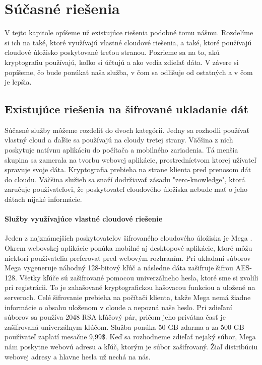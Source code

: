 \chapter{Súčasné riešenia}

V tejto kapitole opíšeme už existujúce riešenia podobné tomu nášmu. Rozdelíme si ich na také, ktoré využívajú vlastné cloudové riešenia, a také, ktoré používajú cloudové úložisko poskytované treťou stranou. Pozrieme sa na to, akú kryptografiu používajú, koľko si účtujú a ako vedia zdieľať dáta. V závere si popíšeme, čo bude ponúkať naša služba, v čom sa odlišuje od ostatných a v čom je lepšia.
	
\section{Existujúce riešenia na šifrované ukladanie dát}
	Súčasné služby môžeme rozdeliť do dvoch kategórií. Jedny sa rozhodli používať vlastný cloud a ďaľšie sa používajú na cloudy tretej strany. Väčšina z nich poskytuje natívnu aplikáciu do počítača a mobilného zariadenia. Tá menšia skupina sa zamerala na tvorbu webovej aplikácie, prostredníctvom ktorej užívateľ spravuje svoje dáta. Kryptografia prebieha na strane klienta pred prenosom dát do cloudu. Väčšina služieb sa snaží dodržiavať zásadu "zero-knowledge", ktorá zaručuje používateľovi, že poskytovateľ cloudového úložiska nebude mať o jeho dátach nijaké informácie. 
	
	\subsubsection{Služby využívajúce vlastné cloudové riešenie}
		Jeden z najznámejších poskytovateľov šifrovaného cloudového úložiska je Mega \cite{mega}. Okrem webovskej aplikácie ponúka mobilné aj desktopové aplikácie, ktoré môžu niektorí používatelia preferovať pred webovým rozhraním. Pri ukladaní súborov Mega vygeneruje náhodný 128-bitový kľúč a následne dáta zašifruje šifrou AES-128. Všetky kľúče sú zašifrované pomocou univerzálneho hesla, ktoré sme si zvolili pri registrácii. To je zahašované kryptografickou hašovacou funkciou a uložené na serveroch. Celé šifrovanie prebieha na počítači klienta, takže Mega nemá žiadne informácie o obsahu uloženom v cloude a nepozná naše heslo. Pri zdieľaní súborov sa používa 2048 RSA kľúčový pár, pričom jeho privátna časť je zašifrovaná univerzálnym kľúčom. Služba ponúka 50 GB zdarma a za 500 GB používateľ zaplatí mesačne 9,99\$. Keď sa rozhodneme zdieľať nejaký súbor, Mega nám poskytne webovú adresu a kľúč, ktorým je súbor zašifrovaný. Žiaľ distribúciu webovej adresy a hlavne hesla už nechá na nás.
		
